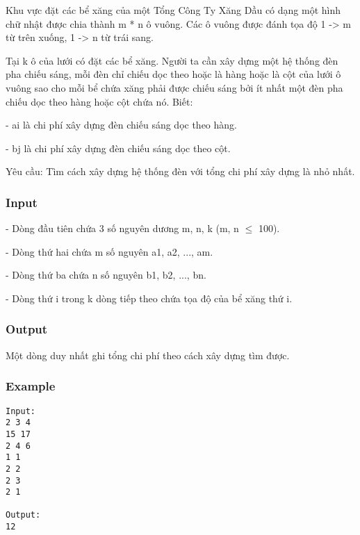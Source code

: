 



   Khu vực đặt các bể xăng của một Tổng Công Ty Xăng Dầu có dạng một hình chữ nhật được chia thành m * n ô vuông. Các ô vuông được đánh tọa độ 1 -> m từ trên xuống, 1 -> n từ trái sang.   


   Tại k ô của lưới có đặt các bể xăng. Người ta cần xây dựng một hệ thống đèn pha chiếu sáng, mỗi đèn chỉ chiếu dọc theo hoặc là hàng hoặc là cột của lưới ô vuông sao cho mỗi bể chứa xăng phải được chiếu sáng bởi ít nhất một đèn pha chiếu dọc theo hàng hoặc cột chứa nó. Biết:   


   - ai là chi phí xây dựng đèn chiếu sáng dọc theo hàng.   


   - bj là chi phí xây dựng đèn chiếu sáng dọc theo cột.  

       Yêu cầu:      Tìm cách xây dựng hệ thống đèn với tổng chi phí xây dựng là nhỏ nhất.  

\subsubsection{   Input  }

   - Dòng đầu tiên chứa 3 số nguyên dương m, n, k (m, n  $\le$  100).   


   - Dòng thứ hai chứa m số nguyên a1, a2, ..., am.   


   - Dòng thứ ba chứa n số nguyên b1, b2, ..., bn.   


   - Dòng thứ i trong k dòng tiếp theo chứa tọa độ của bể xăng thứ i.  

\subsubsection{   Output  }

   Một dòng duy nhất ghi tổng chi phí theo cách xây dựng tìm được.  

\subsubsection{   Example  }
\begin{verbatim}
Input:
2 3 4
15 17
2 4 6
1 1
2 2
2 3
2 1

Output:
12
\end{verbatim}
